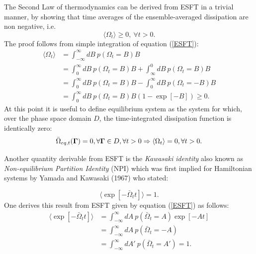 \documentclass[a4paper,12pt]{article}
\begin{document}
The Second Law of thermodynamics can be derived from ESFT in a trivial manner, by showing that time averages of the ensemble-averaged dissipation are non negative, i.e.
\begin{equation}
  \langle\Omega_t\rangle\geq 0,\  \forall t > 0.
\end{equation}
 The proof follows from simple integration of equation (\ref{ESFT}):
\begin{equation}
\begin{aligned}
  \langle \Omega_t \rangle &= \int_{-\infty}^{\infty} dB\ p(\Omega_t=B)B\\
  &=\int_0^{\infty} dB\ p(\Omega_t=B)B +\int_{\infty}^{0} dB\ p(\Omega_t=B)B \\
  &=\int_0^{\infty} dB\ p(\Omega_t=B)B -\int_{0}^{\infty} dB\ p(\Omega_t=-B)B \\
  &= \int_0^{\infty} dB\ p(\Omega_t=B)B(1-\exp[-B]) \geq 0.
\end{aligned}
\end{equation} 
At this point it is useful to define equilibrium system as the system for which, over the phase space domain $D$, the time-integrated dissipation function is identically zero:
\begin{equation}
  \bar{\Omega}_{eq,t}(\bm{\Gamma})=0, \forall\bm{\Gamma}\in  D, \forall t >0 \\
  \Rightarrow \langle \Omega_t \rangle = 0, \forall t > 0.
\end{equation}

Another quantity derivable from ESFT is the \textit{Kawasaki identity} also known as \textit{Non-equilibrium Partition Identity} (NPI) which was first implied for Hamiltonian systems by Yamada and Kawasaki (1967) \cite{Yamada:1967uo} who stated:

\begin{equation}
  \langle \exp[-\bar{\Omega}_t t] \rangle =1.
\end{equation}
One derives this result from ESFT given by equation (\ref{ESFT}) as follows:
\begin{equation}
\begin{aligned}
  \langle \exp[-\bar{\Omega}_t t] \rangle &= \int_{-\infty}^{\infty} dA\ p(\bar{\Omega}_t=A)\exp[-A t]\\
  &=\int_{-\infty}^{\infty} dA\ p(\bar{\Omega}_t=-A)\\
  &=\int_{-\infty}^{\infty} dA'\ p(\bar{\Omega}_t=A')=1.
\end{aligned}
\end{equation}
\end{document}
